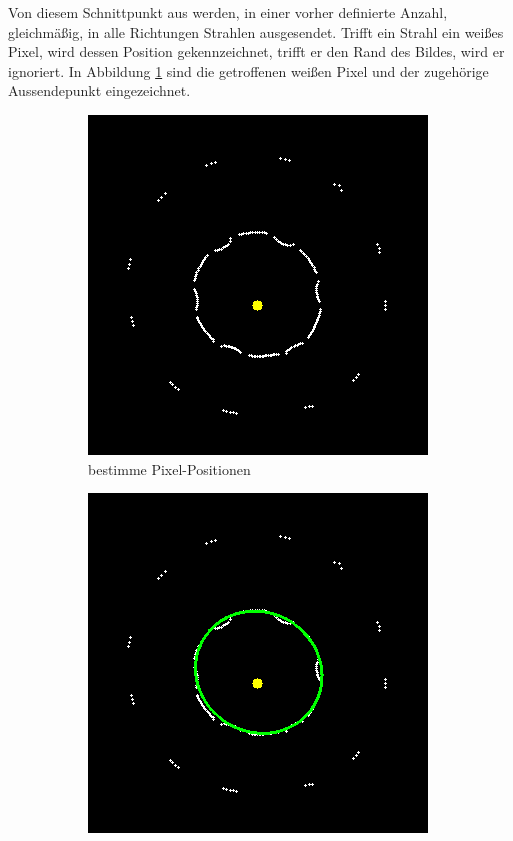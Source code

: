 Von diesem Schnittpunkt aus werden, in einer vorher definierte Anzahl, gleichmäßig, in alle Richtungen Strahlen ausgesendet.
Trifft ein Strahl ein weißes Pixel, wird dessen Position gekennzeichnet, trifft er den Rand des Bildes, wird er ignoriert. In Abbildung \ref{fig:rayCastWOE} sind die getroffenen weißen Pixel und der zugehörige Aussendepunkt eingezeichnet. 

\begin{figure}[!htb]
	\centering
	\begin{subfigure}{.5\textwidth}
		\centering
		\includegraphics[width=.9\textwidth]{images/rayCast0.png}
		\caption{bestimme Pixel-Positionen}
		\label{fig:rayCastWOE}
	\end{subfigure}%
	\begin{subfigure}{.5\textwidth}
		\centering
		\includegraphics[width=.9\textwidth]{images/rayCast0Ellipse.png}

\end{subfigure}
\end{figure}
